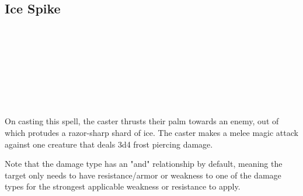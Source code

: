 \subsection*{Ice Spike}
 \\
 \\
 \\
 \\
 \\
 \\
 \\

On casting this spell, the caster thrusts their palm towards an enemy,
out of which protudes a razor-sharp shard of ice. The caster makes a
melee magic attack against one creature that deals 3d4 frost piercing
damage.

Note that the damage type has an "and" relationship by default, meaning
the target only needs to have resistance/armor or weakness to one of
the damage types for the strongest applicable weakness or resistance to
apply.

